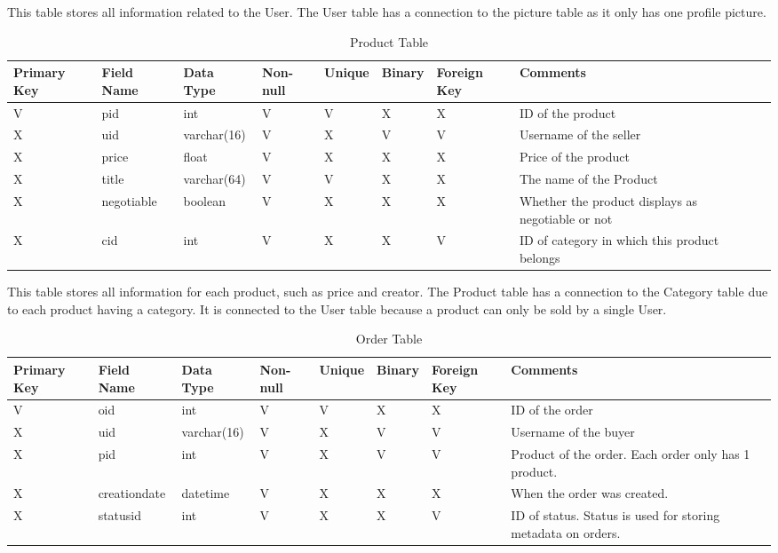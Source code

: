\documentclass[]{article}
\begin{document}
\begin{enumerate}
	This table stores all information related to the User.
	The User table has a connection to the picture table as it only has one profile picture.

	\begin{table}[!h]
	\begin{tabular}{|p{1cm}|p{1cm}|p{2cm}|p{1cm}|p{1cm}|p{1cm}|p{1cm}|p{1cm}|p{4cm}|}
		\hline  Primary Key & Field Name & Data Type & Non-null & Unique & Binary & Foreign Key & Comments \\
		\hline V & pid & int & V & V & X & X & ID of the product\\
		\hline X & uid & varchar(16) & V & X & V & V & Username of the seller\\
		\hline X & price & float & V & X & X & X & Price of the product\\
		\hline X & title & varchar(64) & V & V & X & X & The name of the Product\\
		\hline X & negotiable & boolean & V & X & X & X & Whether the product displays as negotiable or not\\
		\hline X & cid & int & V & X & X & V & ID of category in which this product belongs\\		
	\end{tabular}
	\caption{Product Table}	
	\end{table}	

	This table stores all information for each product, such as price and creator.
	The Product table has a connection to the Category table due to each product having a category. It is connected
	to the User table because a product can only be sold by a single User.

	\begin{table}[!h]
	\begin{tabular}{|p{1cm}|p{1cm}|p{2cm}|p{1cm}|p{1cm}|p{1cm}|p{1cm}|p{1cm}|p{4cm}|}
		\hline  Primary Key & Field Name & Data Type & Non-null & Unique & Binary & Foreign Key & Comments \\
		\hline V & oid & int & V & V & X & X & ID of the order\\
		\hline X & uid & varchar(16) & V & X & V & V & Username of the buyer\\
		\hline X & pid & int & V & X & V & V & Product of the order. Each order only has 1 product.\\
		\hline X & creationdate & datetime & V & X & X & X & When the order was created.\\
		\hline X & statusid & int & V & X & X & V & ID of status. Status is used for storing metadata on orders.\\
	\end{tabular}
	\caption{Order Table}	
	\end{table}	


\end{enumerate}
\end{document}
